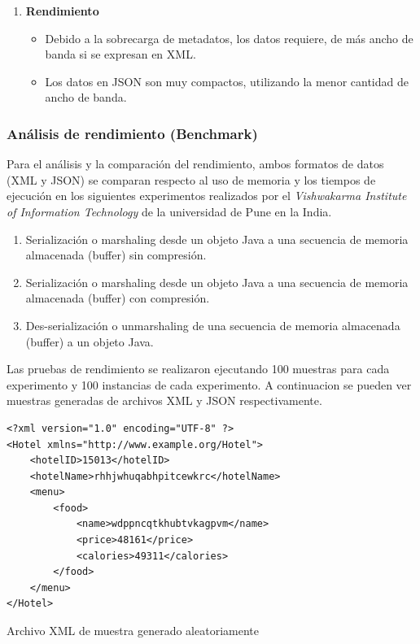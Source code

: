 \begin{enumerate}
    \item \textbf{Rendimiento}
    \begin{itemize}
        \item Debido a la sobrecarga de metadatos, los datos requiere, de más ancho de banda si se expresan en XML.
        \item Los datos en JSON son muy compactos, utilizando la menor cantidad de ancho de banda.
    \end{itemize}
    
\end{enumerate}


\subsubsection{Análisis de rendimiento (Benchmark)}
Para el análisis y la comparación del rendimiento, ambos formatos de datos (XML y JSON) se comparan respecto al uso de memoria y los tiempos de ejecución en los siguientes experimentos realizados por el \textit{Vishwakarma Institute of Information Technology} de la universidad de Pune en la India.
\begin{enumerate}
    \item Serialización o marshaling desde un objeto Java a una secuencia de memoria almacenada (buffer) sin compresión.
    \item Serialización o marshaling desde un objeto Java a una secuencia de memoria almacenada (buffer) con compresión.
    \item Des-serialización o unmarshaling de una secuencia de memoria almacenada (buffer) a un objeto Java.
\end{enumerate}

Las pruebas de rendimiento se realizaron ejecutando 100 muestras para cada experimento y 100 instancias de cada experimento. A continuacion se pueden ver muestras generadas de archivos XML y JSON respectivamente.

\begin{verbatim}
<?xml version="1.0" encoding="UTF-8" ?> 
<Hotel xmlns="http://www.example.org/Hotel">
    <hotelID>15013</hotelID>
    <hotelName>rhhjwhuqabhpitcewkrc</hotelName> 
    <menu> 
        <food> 
            <name>wdppncqtkhubtvkagpvm</name> 
            <price>48161</price> 
            <calories>49311</calories>
        </food>
    </menu>
</Hotel>
\end{verbatim}
\begin{center}
\caption{Archivo XML de muestra generado aleatoriamente}
\end{center}

